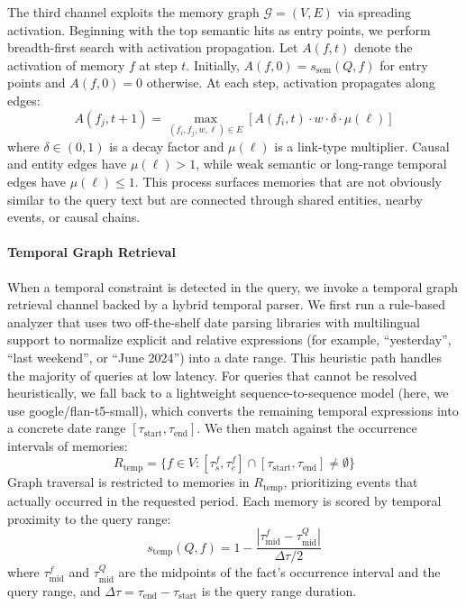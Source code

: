The third channel exploits the memory graph $\mathcal{G} = (V, E)$ via spreading activation. Beginning with the top semantic hits as entry points, we perform breadth-first search with activation propagation. Let $A(f, t)$ denote the activation of memory $f$ at step $t$. Initially, $A(f, 0) = s_{\text{sem}}(Q, f)$ for entry points and $A(f, 0) = 0$ otherwise. At each step, activation propagates along edges:
\begin{equation}
A(f_j, t+1) = \max_{(f_i, f_j, w, \ell) \in E} \left[ A(f_i, t) \cdot w \cdot \delta \cdot \mu(\ell) \right]
\end{equation}
where $\delta \in (0,1)$ is a decay factor and $\mu(\ell)$ is a link-type multiplier. Causal and entity edges have $\mu(\ell) > 1$, while weak semantic or long-range temporal edges have $\mu(\ell) \leq 1$. This process surfaces memories that are not obviously similar to the query text but are connected through shared entities, nearby events, or causal chains.

\paragraph{Temporal Graph Retrieval}

When a temporal constraint is detected in the query, we invoke a temporal graph retrieval channel backed by a hybrid temporal parser. We first run a rule-based analyzer that uses two off-the-shelf date parsing libraries with multilingual support to normalize explicit and relative expressions (for example, ``yesterday'', ``last weekend'', or ``June 2024'') into a date range. This heuristic path handles the majority of queries at low latency. For queries that cannot be resolved heuristically, we fall back to a lightweight sequence-to-sequence model (here, we use google/flan-t5-small), which converts the remaining temporal expressions into a concrete date range $[\tau_{\text{start}}, \tau_{\text{end}}]$. We then match against the occurrence intervals of memories:
\begin{equation}
R_{\text{temp}} = \{f \in V : [\tau_s^f, \tau_e^f] \cap [\tau_{\text{start}}, \tau_{\text{end}}] \neq \emptyset\}
\end{equation}
Graph traversal is restricted to memories in $R_{\text{temp}}$, prioritizing events that actually occurred in the requested period. Each memory is scored by temporal proximity to the query range:
\begin{equation}
s_{\text{temp}}(Q, f) = 1 - \frac{|\tau_{\text{mid}}^f - \tau_{\text{mid}}^Q|}{\Delta \tau / 2}
\end{equation}
where $\tau_{\text{mid}}^f$ and $\tau_{\text{mid}}^Q$ are the midpoints of the fact's occurrence interval and the query range, and $\Delta \tau = \tau_{\text{end}} - \tau_{\text{start}}$ is the query range duration.


